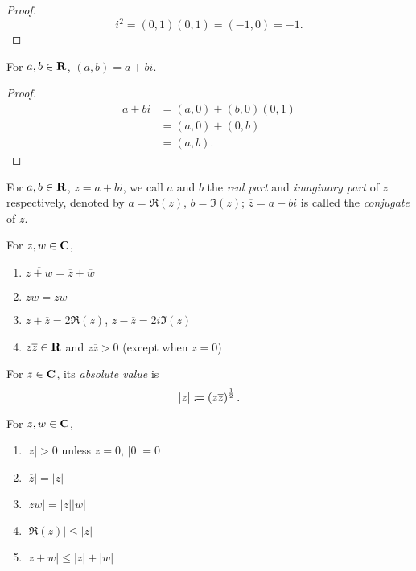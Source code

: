 \begin{proof}
\[i^2=(0,1)(0,1)=(-1,0)=-1.\]
\end{proof}

\begin{proposition}
For $a,b\in\mathbf R$, $(a,b)=a+bi$.
\end{proposition}

\begin{proof}
\begin{align*}
a+bi&=(a,0)+(b,0)(0,1)\\
&=(a,0)+(0,b)\\
&=(a,b).
\end{align*}
\end{proof}

\begin{definition}
For $a,b\in\mathbf R$, $z=a+bi$, we call $a$ and $b$ the \emph{real part} and \emph{imaginary part} of $z$ respectively, denoted by $a=\Re(z)$, $b=\Im(z)$; $\overline{z}=a-bi$ is called the \emph{conjugate} of $z$.
\end{definition}

\begin{proposition}
For $z,w\in\mathbf C$,
\begin{enumerate}[label=(\roman*)]
\item $\overline{z+w}=\overline{z}+\overline{w}$
\item $\overline{zw}=\overline{z}\overline{w}$
\item $z+\overline{z}=2\Re(z)$, $z-\overline{z}=2i\Im(z)$
\item $z\overline{z}\in\mathbf R$ and $z\overline{z}>0$ (except when $z=0$)
\end{enumerate}
\end{proposition}

\begin{definition}
For $z\in\mathbf C$, its \emph{absolute value} is
\[|z|\coloneqq\left(z\overline{z}\right)^\frac{1}{2}.\]
\end{definition}

\begin{proposition}
For $z,w\in\mathbf C$,
\begin{enumerate}[label=(\roman*)]
\item $|z|>0$ unless $z=0$, $|0|=0$
\item $|\overline{z}|=|z|$
\item $|zw|=|z||w|$
\item $|\Re(z)|\le|z|$
\item $|z+w|\le|z|+|w|$
\end{enumerate}
\end{proposition}

